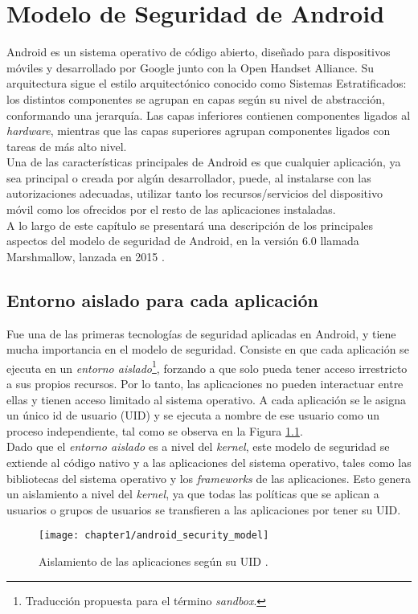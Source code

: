 \chapter{Modelo de Seguridad de Android}
Android \cite{aos} es un sistema operativo de código abierto, diseñado para dispositivos móviles y desarrollado por Google junto con la Open Handset Alliance. Su arquitectura sigue el estilo arquitectónico conocido como Sistemas Estratificados: los distintos componentes se agrupan en capas según su nivel de abstracción, conformando una jerarquía. Las capas inferiores contienen componentes ligados al \textit{hardware}, mientras que las capas superiores agrupan componentes ligados con tareas de más alto nivel.\\

Una de las características principales de Android es que cualquier aplicación, ya sea principal o
creada por algún desarrollador, puede, al instalarse con las autorizaciones adecuadas, utilizar tanto
los recursos/servicios del dispositivo móvil como los ofrecidos por el resto de las aplicaciones
instaladas.\\

A lo largo de este capítulo se presentará una descripción de los principales aspectos del modelo de seguridad de Android,  en la versión 6.0 llamada Marshmallow, lanzada en 2015 \cite{aosm}.
\section{Entorno aislado para cada aplicación}\label{ch01-sandbox}
Fue una de las primeras tecnologías de seguridad aplicadas en Android, y tiene mucha importancia en el modelo de seguridad. Consiste en que cada aplicación se ejecuta en un \emph{entorno aislado}\footnote{Traducción propuesta para el término \textit{sandbox}.}, forzando a que solo pueda tener acceso irrestricto a sus propios recursos. Por lo tanto, las aplicaciones no pueden interactuar entre ellas y tienen acceso limitado al sistema operativo. A cada aplicación se le asigna un único id de usuario (UID) y se ejecuta a nombre de ese usuario como un proceso independiente, tal como se observa en la Figura \ref{fig:ch01:sandbox}.\\

Dado que el \emph{entorno aislado} es a nivel del \textit{kernel}, este modelo de seguridad se extiende al código nativo y a las aplicaciones del sistema operativo, tales como las bibliotecas del sistema operativo y los \textit{frameworks} de las aplicaciones. Esto genera un aislamiento a nivel del \textit{kernel}, ya que todas las políticas que se aplican a usuarios o grupos de usuarios se transfieren a las aplicaciones por tener su UID.
\begin{figure}[hbtp]
	\begin{center}
		\texttt{[image: chapter1/android\_security\_model]}
	    \caption{Aislamiento de las aplicaciones según su UID \cite{asreview2015}.}
	    \label{fig:ch01:sandbox}
    \end{center}
\end{figure}
